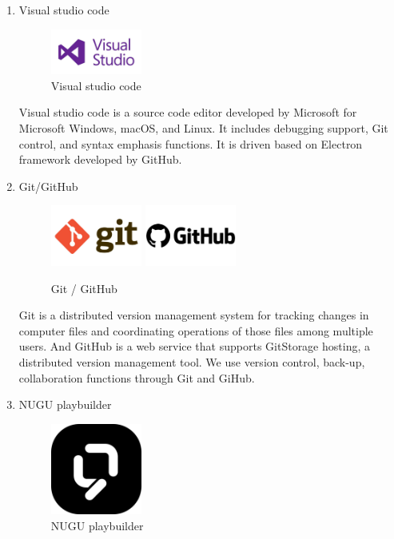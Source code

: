 \documentclass[conference]{IEEEtran}
\begin{document}
\begin{itemize}
\begin{enumerate}
\item Visual studio code
\par \begin{figure}[h!]
\includegraphics[width=3cm]{image/Visual studio code.jpeg}
\centering
\caption{Visual studio code}
\end{figure}

Visual studio code is a source code editor developed by Microsoft for Microsoft Windows, macOS, and Linux. It includes debugging support, Git control, and syntax emphasis functions. It is driven based on Electron framework developed by GitHub.

\item Git/GitHub
\par \begin{figure}[h!]
\includegraphics[width=3cm]{image/Git.jpg}
\includegraphics[width=3cm]{image/GitHub.png}
\centering
\caption{Git / GitHub}
\end{figure}

Git is a distributed version management system for tracking changes in computer files and coordinating operations of those files among multiple users. And GitHub is a web service that supports GitStorage hosting, a distributed version management tool. We use version control, back-up, collaboration functions through Git and GiHub.

\item NUGU playbuilder
\par \begin{figure}[h!]
\includegraphics[width=3cm]{image/NUGU playbuilder.png}
\centering
\caption{NUGU playbuilder}
\end{figure}


\end{enumerate}
\end{itemize}
\end{document}
